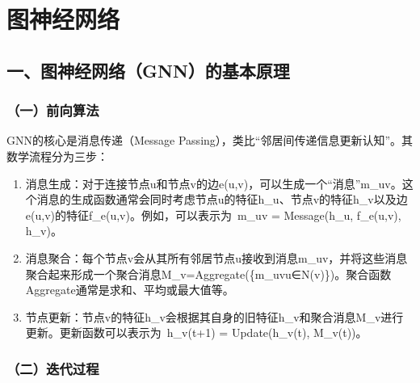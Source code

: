 \setcounter{section}{0}

\hypertarget{ux56feux795eux7ecfux7f51ux7edc-1}{%
\section{图神经网络}\label{ux56feux795eux7ecfux7f51ux7edc-1}}

\hypertarget{ux4e00ux56feux795eux7ecfux7f51ux7edcgnnux7684ux57faux672cux539fux7406}{%
\subsection{一、图神经网络（GNN）的基本原理}\label{ux4e00ux56feux795eux7ecfux7f51ux7edcgnnux7684ux57faux672cux539fux7406}}

\hypertarget{ux4e00ux524dux5411ux7b97ux6cd5}{%
\subsubsection{（一）前向算法}\label{ux4e00ux524dux5411ux7b97ux6cd5}}

GNN的核心是消息传递（Message Passing），类比``邻居间传递信息更新认知''。其数学流程分为三步：

\begin{enumerate}
\def\labelenumi{\arabic{enumi}.}
\item
  消息生成：对于连接节点u和节点v的边e(u,v)，可以生成一个``消息''m\_uv。这个消息的生成函数通常会同时考虑节点u的特征h\_u、节点v的特征h\_v以及边e(u,v)的特征f\_e(u,v)。例如，可以表示为~m\_uv = Message(h\_u, f\_e(u,v), h\_v)。
\item
  消息聚合：每个节点v会从其所有邻居节点u接收到消息m\_uv，并将这些消息聚合起来形成一个聚合消息M\_v=Aggregate(\{m\_uv\textbar u∈N(v)\})。聚合函数Aggregate通常是求和、平均或最大值等。
\item
  节点更新：节点v的特征h\_v会根据其自身的旧特征h\_v和聚合消息M\_v进行更新。更新函数可以表示为~h\_v(t+1) = Update(h\_v(t), M\_v(t))。
\end{enumerate}

\hypertarget{ux4e8cux8fedux4ee3ux8fc7ux7a0b}{%
\subsubsection{（二）迭代过程\hspace{0pt}}\label{ux4e8cux8fedux4ee3ux8fc7ux7a0b}}


